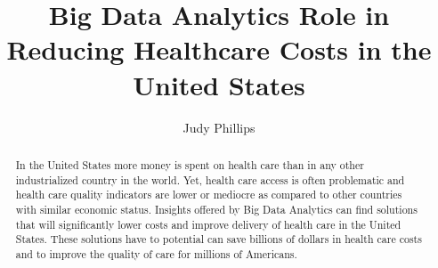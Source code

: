 \documentclass[sigconf]{acmart}
\begin{document}
\title{Big Data Analytics Role in Reducing Healthcare Costs in the United States}


\author{Judy Phillips}


\begin{abstract}
In the United States more money is spent on health care than in any other industrialized country in the world. Yet, health care access is often problematic and health care quality indicators are lower or mediocre as compared to other countries with similar economic status. Insights offered by Big Data Analytics can find solutions that will significantly lower costs and improve delivery of health care in the United States.  These solutions have to potential can save billions of dollars in health care costs and to improve the quality of care for millions of Americans. 
\end{abstract}
\maketitle
\end{document}
